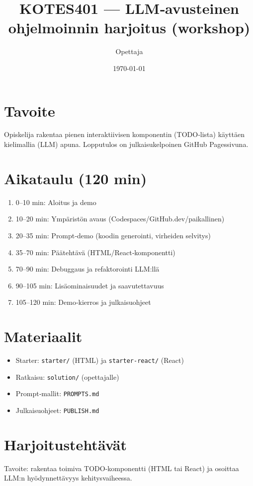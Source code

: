 \documentclass[a4paper,11pt]{article}
\title{KOTES401 — LLM‑avusteinen ohjelmoinnin harjoitus (workshop)}
\author{Opettaja}
\date{\today}
\begin{document}
\maketitle
\section*{Tavoite}
Opiskelija rakentaa pienen interaktiivisen komponentin (TODO‑lista) käyttäen kielimallia (LLM) apuna. Lopputulos on julkaisukelpoinen GitHub Pages\-sivuna.

\section*{Aikataulu (120 min)}
\begin{enumerate}[leftmargin=*]
  \item 0--10 min: Aloitus ja demo
  \item 10--20 min: Ympäristön avaus (Codespaces/GitHub.dev/paikallinen)
  \item 20--35 min: Prompt‑demo (koodin generointi, virheiden selvitys)
  \item 35--70 min: Päätehtävä (HTML/React‑komponentti)
  \item 70--90 min: Debuggaus ja refaktorointi LLM:llä
  \item 90--105 min: Lisäominaisuudet ja saavutettavuus
  \item 105--120 min: Demo‑kierros ja julkaisuohjeet
\end{enumerate}

\section*{Materiaalit}
\begin{itemize}
  \item Starter: \texttt{starter/} (HTML) ja \texttt{starter-react/} (React)
  \item Ratkaisu: \texttt{solution/} (opettajalle)
  \item Prompt‑mallit: \texttt{PROMPTS.md}
  \item Julkaisuohjeet: \texttt{PUBLISH.md}
\end{itemize}

\section*{Harjoitustehtävät}
Tavoite: rakentaa toimiva TODO‑komponentti (HTML tai React) ja osoittaa LLM:n hyödynnettävyys kehitysvaiheessa.
\end{document}
